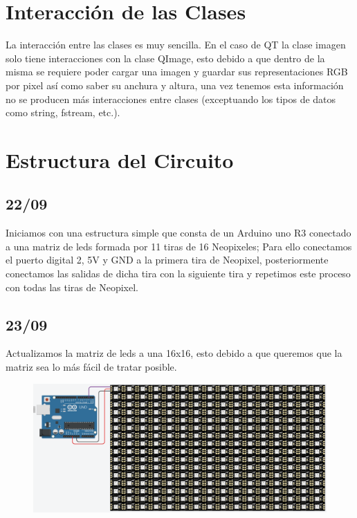 \documentclass{article}
\begin{document}
    
\section{Interacción de las Clases}
\label{interacciones}
    \begin{flushleft}
    La interacción entre las clases es muy sencilla. En el caso de QT la clase imagen solo tiene interacciones con la clase QImage, esto debido a que dentro de la misma se requiere poder cargar una imagen y guardar sus representaciones RGB por pixel así como saber su anchura y altura, una vez tenemos esta información no se producen más interacciones entre clases (exceptuando los tipos de datos como string, fstream, etc.).
    \end{flushleft}
    
    
\section{Estructura del Circuito}
\label{circuito}
    \vspace{0.1cm}

    \begin{flushleft}
        \subsection{22/09}
        Iniciamos con una estructura simple que consta de un Arduino uno R3 conectado a una matriz de leds formada por 11 tiras de 16 Neopixeles; Para ello conectamos el puerto digital 2, 5V y GND a la primera tira de Neopixel, posteriormente conectamos las salidas de dicha tira con la siguiente tira y repetimos este proceso con todas las tiras de Neopixel.
    \end{flushleft}
    
    \begin{flushleft}
        \subsection{23/09}
        Actualizamos la matriz de leds a una 16x16, esto debido a que queremos que la matriz sea lo más fácil de tratar posible.
    \end{flushleft}
    
    \begin{figure}[h]
    \includegraphics[width=12cm]{Images/leds.png}
    \centering
    \label{fig:leds}
    \end{figure}
    \vspace{0.5cm}
    
\end{document}
